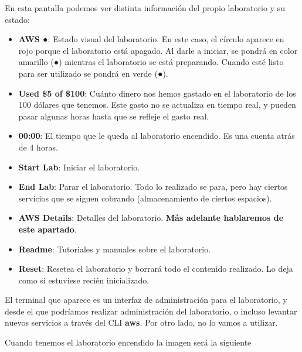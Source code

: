 En esta pantalla podemos ver distinta información del propio laboratorio y su estado:

\begin{itemize}
	\item \textbf{AWS \color{red}●}: Estado visual del laboratorio. En este caso, el círculo aparece en rojo porque el laboratorio está apagado. Al darle a iniciar, se pondrá en color amarillo ({\color{yellow}●}) mientras el laboratorio se está preparando. Cuando esté listo para ser utilizado se pondrá en verde ({\color{green}●}).
	
	\item \textbf{Used \$5 of \$100}: Cuánto dinero nos hemos gastado en el laboratorio de los 100 dólares que tenemos. Este gasto no se actualiza en tiempo real, y pueden pasar algunas horas hasta que se refleje el gasto real.
	
	\item \textbf{00:00}: El tiempo que le queda al laboratorio encendido. Es una cuenta atrás de 4 horas. 
	
	\item \faPlay  \textbf{ Start Lab}: Iniciar el laboratorio.
	
	\item \faStop  \textbf{ End Lab}: Parar el laboratorio. Todo lo realizado se para, pero hay ciertos servicios que se siguen cobrando (almacenamiento de ciertos espacios).
	
	\item \faInfo  \textbf{ AWS Details}: Detalles del laboratorio. \textbf{Más adelante hablaremos de este apartado}.
	
	\item \faInfo  \textbf{ Readme}: Tutoriales y manuales sobre el laboratorio.
	
	\item \faUndo \textbf{ Reset}: Resetea el laboratorio y borrará todo el contenido realizado. Lo deja como si estuviese recién inicializado.
\end{itemize}

El terminal que aparece es un interfaz de administración para el laboratorio, y desde el que podríamos realizar administración del laboratorio, o incluso levantar nuevos servicios a través del CLI \textbf{aws}. Por otro lado, no lo vamos a utilizar.


Cuando tenemos el laboratorio encendido la imagen será la siguiente

